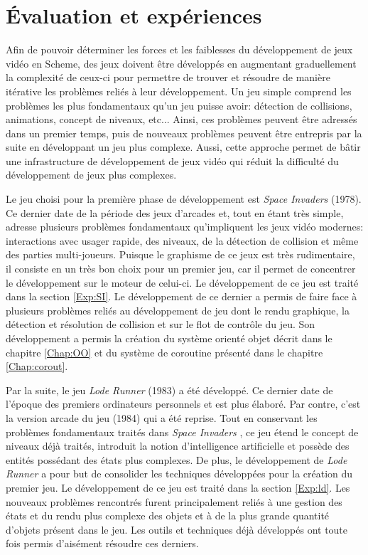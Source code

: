 \documentclass[12pt,oneside,letterpaper,francais]{book}
\newcommand{\lr}{{\textit{Lode Runner }}}
\newcommand{\si}{{\textit{Space Invaders }}}
\begin{document}
\chapter{Évaluation et expériences}
\label{Chap:exp}

Afin de pouvoir déterminer les forces et les faiblesses du
développement de jeux vidéo en Scheme, des jeux doivent être
développés en augmentant graduellement la complexité de ceux-ci pour
permettre de trouver et résoudre de manière itérative les problèmes
reliés à leur développement. Un jeu simple comprend les problèmes les
plus fondamentaux qu'un jeu puisse avoir: détection de collisions,
animations, concept de niveaux, etc... Ainsi, ces problèmes peuvent
être adressés dans un premier temps, puis de nouveaux problèmes
peuvent être entrepris par la suite en développant un jeu plus
complexe. Aussi, cette approche permet de bâtir une infrastructure de
développement de jeux vidéo qui réduit la difficulté du développement
de jeux plus complexes.

Le jeu choisi pour la première phase de développement est \si
(1978). Ce dernier date de la période des jeux d'arcades et, tout en
étant très simple, adresse plusieurs problèmes fondamentaux
qu'impliquent les jeux vidéo modernes: interactions avec usager
rapide, des niveaux, de la détection de collision et même des parties
multi-joueurs. Puisque le graphisme de ce jeux est très rudimentaire,
il consiste en un très bon choix pour un premier jeu, car il permet de
concentrer le développement sur le moteur de celui-ci. Le
développement de ce jeu est traité dans la section \ref{Exp:SI}. Le
développement de ce dernier a permis de faire face à plusieurs
problèmes reliés au développement de jeu dont le rendu graphique, la
détection et résolution de collision et sur le flot de contrôle du
jeu. Son développement a permis la création du système orienté objet
décrit dans le chapitre \ref{Chap:OO} et du système de coroutine
présenté dans le chapitre \ref{Chap:corout}.

Par la suite, le jeu \lr (1983) a été développé. Ce dernier date de
l'époque des premiers ordinateurs personnels et est plus élaboré. Par
contre, c'est la version arcade du jeu (1984) qui a été reprise. Tout
en conservant les problèmes fondamentaux traités dans \si, ce jeu
étend le concept de niveaux déjà traités, introduit la notion
d'intelligence artificielle et possède des entités possédant des états
plus complexes. De plus, le développement de \lr a pour but de
consolider les techniques développées pour la création du premier
jeu. Le développement de ce jeu est traité dans la section
\ref{Exp:ld}. Les nouveaux problèmes rencontrés furent principalement
reliés à une gestion des états et du rendu plus complexe des objets et
à de la plus grande quantité d'objets présent dans le jeu. Les outils
et techniques déjà développés ont toute fois permis d'aisément
résoudre ces derniers.
\end{document}
